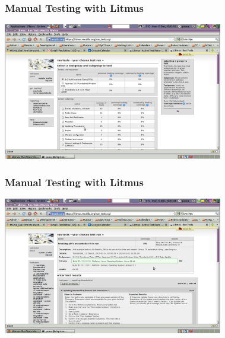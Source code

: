 \documentclass{beamer}
\begin{document}

\begin{frame}
\frametitle{Manual Testing with Litmus}
\begin{center}
 \includegraphics[height=6cm]{figs/Litmus_02_Testgroup_Selection.png}
\begin{figure}
\end{figure}
\end{center}
\end{frame}


\begin{frame}
\frametitle{Manual Testing with Litmus}
\begin{center}
 \includegraphics[height=6cm]{figs/Litmus_03_Test_Run_Intro.png}
\begin{figure}
\end{figure}
\end{center}
\end{frame}

\end{document}
